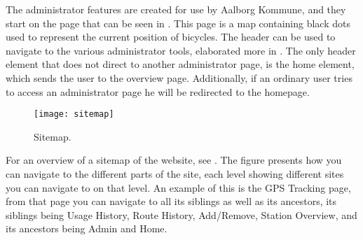 The administrator features are created for use by Aalborg Kommune, and they start on the page that can be seen in .
This page is a map containing black dots used to represent the current position of bicycles.
The header can be used to navigate to the various administrator tools, elaborated more in .
The only header element that does not direct to another administrator page, is the home element, which sends the user to the overview page.
Additionally, if an ordinary user tries to access an administrator page he will be redirected to the homepage.

\begin{figure}[h]
	\centering
	\texttt{[image: sitemap]}
	\caption{Sitemap.}\label{fig:sitemap}
\end{figure}

For an overview of a sitemap of the website, see .
The figure presents how you can navigate to the different parts of the site, each level showing different sites you can navigate to on that level.
An example of this is the GPS Tracking page, from that page you can navigate to all its siblings as well as its ancestors, its siblings being Usage History, Route History, Add/Remove, Station Overview, and its ancestors being Admin and Home.
